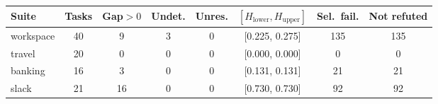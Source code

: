 \begin{tabular}{lccccccc}
\toprule
Suite & Tasks & Gap$>0$ & Undet. & Unres. & $[H_{\mathrm{lower}}, H_{\mathrm{upper}}]$ & Sel.\ fail. & Not refuted \\
\midrule
workspace & 40 & 9 & 3 & 0 & [0.225, 0.275] & 135 & 135 \\
travel & 20 & 0 & 0 & 0 & [0.000, 0.000] & 0 & 0 \\
banking & 16 & 3 & 0 & 0 & [0.131, 0.131] & 21 & 21 \\
slack & 21 & 16 & 0 & 0 & [0.730, 0.730] & 92 & 92 \\
\bottomrule
\end{tabular}
